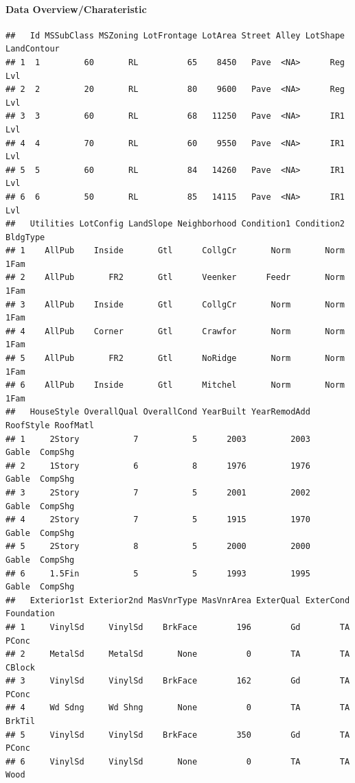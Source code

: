 \documentclass[
]{article}
\begin{document}
\hypertarget{data-overviewcharateristic}{%
\paragraph{Data
Overview/Charateristic}\label{data-overviewcharateristic}}

\begin{verbatim}
##   Id MSSubClass MSZoning LotFrontage LotArea Street Alley LotShape LandContour
## 1  1         60       RL          65    8450   Pave  <NA>      Reg         Lvl
## 2  2         20       RL          80    9600   Pave  <NA>      Reg         Lvl
## 3  3         60       RL          68   11250   Pave  <NA>      IR1         Lvl
## 4  4         70       RL          60    9550   Pave  <NA>      IR1         Lvl
## 5  5         60       RL          84   14260   Pave  <NA>      IR1         Lvl
## 6  6         50       RL          85   14115   Pave  <NA>      IR1         Lvl
##   Utilities LotConfig LandSlope Neighborhood Condition1 Condition2 BldgType
## 1    AllPub    Inside       Gtl      CollgCr       Norm       Norm     1Fam
## 2    AllPub       FR2       Gtl      Veenker      Feedr       Norm     1Fam
## 3    AllPub    Inside       Gtl      CollgCr       Norm       Norm     1Fam
## 4    AllPub    Corner       Gtl      Crawfor       Norm       Norm     1Fam
## 5    AllPub       FR2       Gtl      NoRidge       Norm       Norm     1Fam
## 6    AllPub    Inside       Gtl      Mitchel       Norm       Norm     1Fam
##   HouseStyle OverallQual OverallCond YearBuilt YearRemodAdd RoofStyle RoofMatl
## 1     2Story           7           5      2003         2003     Gable  CompShg
## 2     1Story           6           8      1976         1976     Gable  CompShg
## 3     2Story           7           5      2001         2002     Gable  CompShg
## 4     2Story           7           5      1915         1970     Gable  CompShg
## 5     2Story           8           5      2000         2000     Gable  CompShg
## 6     1.5Fin           5           5      1993         1995     Gable  CompShg
##   Exterior1st Exterior2nd MasVnrType MasVnrArea ExterQual ExterCond Foundation
## 1     VinylSd     VinylSd    BrkFace        196        Gd        TA      PConc
## 2     MetalSd     MetalSd       None          0        TA        TA     CBlock
## 3     VinylSd     VinylSd    BrkFace        162        Gd        TA      PConc
## 4     Wd Sdng     Wd Shng       None          0        TA        TA     BrkTil
## 5     VinylSd     VinylSd    BrkFace        350        Gd        TA      PConc
## 6     VinylSd     VinylSd       None          0        TA        TA       Wood

\end{verbatim}
\end{document}
